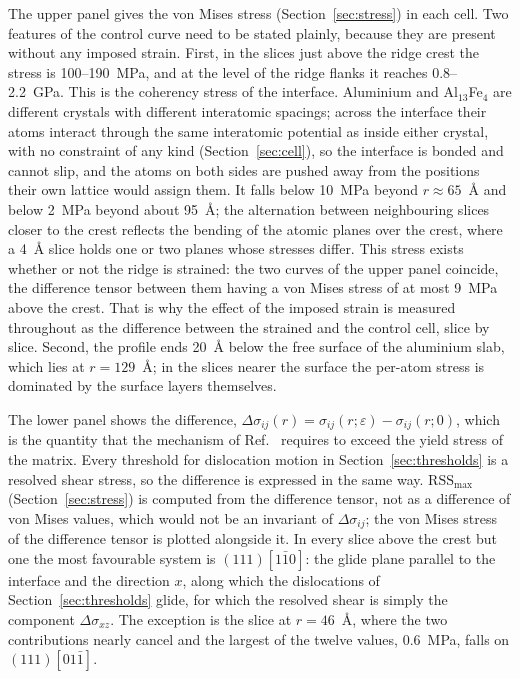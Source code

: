 The upper panel gives the von Mises stress (Section~\ref{sec:stress}) in
each cell. Two features of the control curve need to
be stated plainly, because they are present without any imposed strain.
First, in the slices just above the ridge crest the stress is 100--190~MPa,
and at the level of the ridge flanks it reaches 0.8--2.2~GPa. This is the
coherency stress of the interface. Aluminium and Al$_{13}$Fe$_4$ are
different crystals with different interatomic spacings; across the interface
their atoms interact through the same interatomic potential as inside either
crystal, with no constraint of any kind (Section~\ref{sec:cell}), so the
interface is bonded and cannot slip, and the atoms on both sides are pushed
away from the positions their own lattice would assign them. It falls below
10~MPa beyond $r\approx65$~\AA{} and below 2~MPa beyond about 95~\AA{}; the
alternation between neighbouring slices closer to the crest reflects the
bending of the atomic planes over the crest, where a 4~\AA{} slice holds one
or two planes whose stresses differ. This stress exists whether or not the
ridge is strained: the two curves of the upper panel coincide, the
difference tensor between them having a von Mises stress of at most 9~MPa
above the crest. That is why the effect of the imposed strain is measured
throughout as the difference between the strained and the control cell,
slice by slice. Second, the profile ends 20~\AA{} below the free surface of
the aluminium slab, which lies at $r=129$~\AA{}; in the slices nearer the
surface the per-atom stress is dominated by the surface layers themselves.

The lower panel shows the difference,
$\Delta\sigma_{ij}(r)=\sigma_{ij}(r;\varepsilon)-\sigma_{ij}(r;0)$, which is
the quantity that the mechanism of Ref.~\cite{Friha2024JMMM} requires to
exceed the yield stress of the matrix. Every threshold for dislocation
motion in Section~\ref{sec:thresholds} is a resolved shear stress, so the
difference is expressed in the same way. $\mathrm{RSS}_{\max}$ (Section~\ref{sec:stress}) is computed from the difference tensor, not as a difference of von Mises
values, which would not be an invariant of $\Delta\sigma_{ij}$; the von
Mises stress of the difference tensor is plotted alongside it. In every
slice above the crest but one the most favourable system is
$(111)[1\bar{1}0]$: the
glide plane parallel to the interface and the direction $x$, along which
the dislocations of Section~\ref{sec:thresholds} glide, for which the
resolved shear is simply the component $\Delta\sigma_{xz}$. The exception is
the slice at $r=46$~\AA{}, where the two contributions nearly cancel and the
largest of the twelve values, 0.6~MPa, falls on $(111)[01\bar{1}]$.

